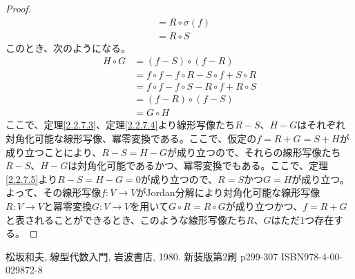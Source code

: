 \documentclass[dvipdfmx]{jsarticle}
\begin{document}
\begin{proof}
\begin{align*}
&= R \circ \sigma(f) \\
&= R \circ S
\end{align*}
このとき、次のようになる。
\begin{align*}
H \circ G &= (f - S) \circ (f - R) \\
&= f \circ f - f \circ R - S \circ f + S \circ R \\
&= f \circ f - f \circ S - R \circ f + R \circ S \\
&= (f - R) \circ (f - S) \\
&= G \circ H
\end{align*}
ここで、定理\ref{2.2.7.3}、定理\ref{2.2.7.4}より線形写像たち$R - S$、$H - G$はそれぞれ対角化可能な線形写像、冪零変換である。ここで、仮定の$f = R + G = S + H$が成り立つことにより、$R - S = H - G$が成り立つので、それらの線形写像たち$R - S$、$H - G$は対角化可能であるかつ、冪零変換でもある。ここで、定理\ref{2.2.7.5}より$R - S = H - G = 0$が成り立つので、$R = S$かつ$G = H$が成り立つ。よって、その線形写像$f:V \rightarrow V$がJordan分解により対角化可能な線形写像$R:V \rightarrow V$と冪零変換$G:V \rightarrow V$を用いて$G \circ R = R \circ G$が成り立つかつ、$f = R + G$と表されることができるとき、このような線形写像たち$R$、$G$はただ1つ存在する。
\end{proof}
\begin{thebibliography}{50}
    松坂和夫, 線型代数入門, 岩波書店, 1980. 新装版第2刷 p299-307 ISBN978-4-00-029872-8
\end{thebibliography}
\end{document}
